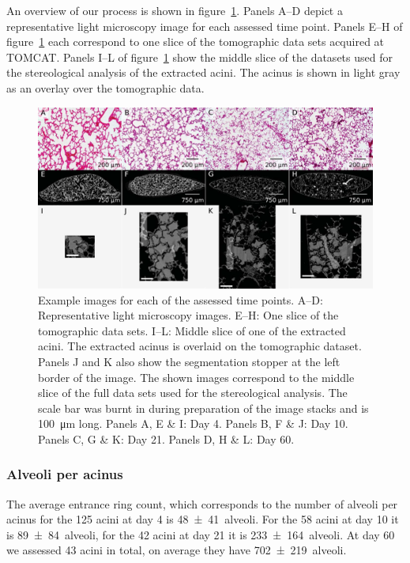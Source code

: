 \documentclass[
  american,
]{article}
\begin{document}
An overview of our process is shown in figure~\ref{fig:01}.
Panels A--D depict a representative light microscopy image for each assessed time point.
Panels E--H of figure~\ref{fig:01} each correspond to one slice of the tomographic data sets acquired at TOMCAT.
Panels I--L of figure~\ref{fig:01} show the middle slice of the datasets used for the stereological analysis of the extracted acini.
The acinus is shown in light gray as an overlay over the tomographic data.

\begin{figure}
\hypertarget{fig:01}{%
\centering
\includegraphics{images/fig01.png}
\caption{Example images for each of the assessed time points.
A--D: Representative light microscopy images.
E--H: One slice of the tomographic data sets.
I--L: Middle slice of one of the extracted acini.
The extracted acinus is overlaid on the tomographic dataset.
Panels J and K also show the segmentation stopper at the left border of the image.
The shown images correspond to the middle slice of the full data sets used for the stereological analysis.
The scale bar was burnt in during preparation of the image stacks and is 100~μm long.
Panels A, E \& I: Day 4.
Panels B, F \& J: Day 10.
Panels C, G \& K: Day 21.
Panels D, H \& L: Day 60.}\label{fig:01}
}
\end{figure}

\hypertarget{alveoli-per-acinus}{%
\subsubsection{Alveoli per acinus}\label{alveoli-per-acinus}}

The average entrance ring count, which corresponds to the number of alveoli per acinus for the 125 acini at day 4 is 48~±~41~alveoli.
For the 58 acini at day 10 it is 89~±~84~alveoli, for the 42 acini at day 21 it is 233~±~164~alveoli.
At day 60 we assessed 43 acini in total, on average they have 702~±~219~alveoli.
\end{document}
